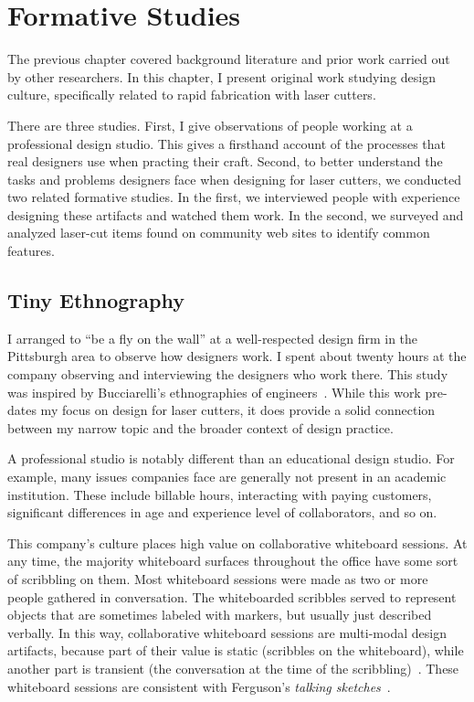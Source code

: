 \chapter{Formative Studies}
\label{sec:formative}


The previous chapter covered background literature and prior work
carried out by other researchers. In this chapter, I present original
work studying design culture, specifically related to rapid
fabrication with laser cutters.

There are three studies. First, I give observations of people working
at a professional design studio. This gives a firsthand account of the
processes that real designers use when practing their craft. Second,
to better understand the tasks and problems designers face when
designing for laser cutters, we conducted two related formative
studies.  In the first, we interviewed people with experience
designing these artifacts and watched them work. In the second, we
surveyed and analyzed laser-cut items found on community web sites to
identify common features.

\section{Tiny Ethnography}
\label{sec:formative-tiny-ethnography}

I arranged to ``be a fly on the wall'' at a well-respected design firm
in the Pittsburgh area to observe how designers work. I spent about
twenty hours at the company observing and interviewing the designers
who work there. This study was inspired by Bucciarelli's ethnographies
of engineers~\cite{bucciarelli-designing-engineers}. While this work
pre-dates my focus on design for laser cutters, it does provide a
solid connection between my narrow topic and the broader context of
design practice.

A professional studio is notably different than an educational design
studio. For example, many issues companies face are generally not
present in an academic institution. These include billable hours,
interacting with paying customers, significant differences in age and
experience level of collaborators, and so on. 

This company's culture places high value on collaborative whiteboard
sessions. At any time, the majority whiteboard surfaces throughout the
office have some sort of scribbling on them. Most whiteboard sessions
were made as two or more people gathered in conversation. The
whiteboarded scribbles served to represent objects that are sometimes
labeled with markers, but usually just described verbally. In this
way, collaborative whiteboard sessions are multi-modal design
artifacts, because part of their value is static (scribbles on the
whiteboard), while another part is transient (the conversation at the
time of the scribbling)~\cite{ju-navigator}. These whiteboard sessions
are consistent with Ferguson's \textit{talking
  sketches}~\cite{ferguson-engineering}.

